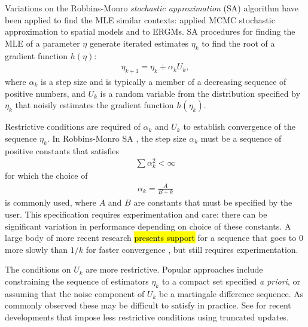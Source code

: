 Variations on the Robbins-Monro \emph{stochastic approximation} (SA) algorithm 
\citep{Robbins-Monro} have been applied to find the MLE similar contexts: 
\citet{Younes:1988,Younes:1989,Moyeed:1991,Gu:2001}
applied MCMC stochastic approximation to spatial models and \citet{Snijders:2002} to 
ERGMs.
SA procedures for finding the MLE of a parameter $\eta$ generate iterated estimates 
$\eta_k$ to find the 
root of a gradient function $h(\eta)$:
\begin{align} \label{E:eta SA update}
	\eta_{k+1} = \eta_k + \alpha_k U_k,
\end{align}
where $\alpha_k$ is a step size and is typically a member of a decreasing sequence of 
positive numbers, and $U_k$ is a 
random variable from the distribution specified by $\eta_k$ that noisily estimates the 
gradient function $h(\eta_k)$.  

Restrictive conditions are required of $\alpha_k$ and $U_k$ to establish convergence 
of the sequence $\eta_k$.  
In Robbins-Monro SA \citep{Robbins-Monro}, the step size $\alpha_k$ must be a sequence 
of positive constants 
that satisfies 
\begin{align*}
	\sum \alpha_k^2 < \infty
\end{align*}
for which the choice of
\begin{align} \label{E:SA step size}
	\alpha_k = \frac{A}{B + k}
\end{align}
 is commonly used, where $A$ and $B$ are constants that must be specified by the user.  
This specification requires experimentation and care: there can be significant 
variation in performance depending on choice of these constants. 
A large body of more recent research \hl{presents support} for a sequence that goes to 0 
more slowly than $1/k$ 
for faster convergence \citep[Chapter 11]{Kushner:1997}, but still requires 
experimentation.  

The conditions on $U_k$ are more restrictive.  Popular approaches include constraining 
the sequence of estimators $\eta_k$ to a compact set specified \emph{a priori}, 
or assuming that the noise component of $U_k$ be a martingale 
difference sequence.  As commonly observed \citep*{Chen:2002,Andrieu:2005,Liang:2010} 
these may be 
difficult to satisfy in practice.  
See \citep{Andrieu:2005,Liang:2010} for recent developments that impose less 
restrictive conditions using truncated 
updates.

